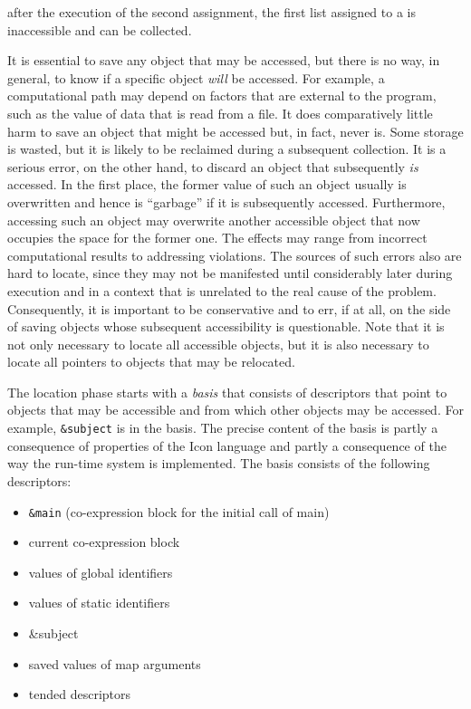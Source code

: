 \noindent after the execution of the second assignment, the first list
assigned to a is inaccessible and can be collected.

It is essential to save any object that may be accessed, but there is
no way, in general, to know if a specific object \textit{will} be
accessed. For example, a computational path may depend on factors that
are external to the program, such as the value of data that is read
from a file. It does comparatively little harm to save an object that
might be accessed but, in fact, never is. Some storage is wasted, but
it is likely to be reclaimed during a subsequent collection. It is a
serious error, on the other hand, to discard an object that
subsequently \textit{is} accessed. In the first place, the former
value of such an object usually is overwritten and hence is
``garbage'' if it is subsequently accessed. Furthermore, accessing
such an object may overwrite another accessible object that now
occupies the space for the former one. The effects may range from
incorrect computational results to addressing violations. The sources
of such errors also are hard to locate, since they may not be
manifested until considerably later during execution and in a context
that is unrelated to the real cause of the problem. Consequently, it
is important to be conservative and to err, if at all, on the side of
saving objects whose subsequent accessibility is questionable. Note
that it is not only necessary to locate all accessible objects, but it
is also necessary to locate all pointers to objects that may be
relocated.

The location phase starts with a \textit{basis} that consists of
descriptors that point to objects that may be accessible and from
which other objects may be accessed. For example, \texttt{\&subject}
is in the basis. The precise content of the basis is partly a
consequence of properties of the Icon language and partly a
consequence of the way the run-time system is implemented. The basis
consists of the following descriptors:

\liststyleLxiii
\begin{itemize}
\item 
\texttt{\&main} (co-expression block for the initial call of main)
\item 
current co-expression block
\item 
values of global identifiers
\item 
values of static identifiers
\item {\ttfamily
\&subject}
\item 
saved values of map arguments
\item 
tended descriptors
\end{itemize}

